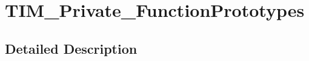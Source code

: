 \hypertarget{group___t_i_m___private___function_prototypes}{}\section{T\+I\+M\+\_\+\+Private\+\_\+\+Function\+Prototypes}
\label{group___t_i_m___private___function_prototypes}


\subsection{Detailed Description}
